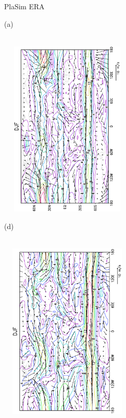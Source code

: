 \documentclass[12pt,a4paper,twoside,openright,headinclude,liststotoc,bibtotoc]{scrreprt}
\begin{document}
\begin{figure}[H]
\hspace{3.8cm}PlaSim \vspace{0.2cm}\hspace{7.1cm} ERA \\
\parbox{8.5cm}{\hspace{0.50cm}\begin{scriptsize}(a)\end{scriptsize} \vspace{-0.7cm} \\
\includegraphics[height=8.5cm,width=6.5cm,angle=-90]
{eps/uv850DJF.eps}
}
\parbox{8.5cm}{\hspace{0.25cm}\begin{scriptsize}(d)\end{scriptsize} \vspace{-0.7cm} \\
\includegraphics[height=8.5cm,width=6.5cm,angle=-90]
{eps/t21uv850DJF.eps}
}
\end{figure}
\end{document}
